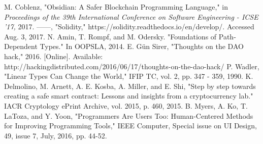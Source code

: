 \documentclass[sigplan,10pt,review]{acmart}\settopmatter{printfolios=true}
\begin{document}
\begin{thebibliography}{9}
	M. Coblenz, "Obsidian: A Safer Blockchain Programming Language," 
	in \emph{Proceedings of the 39th International Conference on Software Engineering -
	ICSE '17,} 2017.
	------, "Solidity," https://solidity.readthedocs.io/en/develop/. Accessed Aug. 3, 2017.
	 N. Amin, T. Rompf, and M. Odersky. "Foundations of Path-Dependent Types." 
	 In OOPSLA, 2014.
	E. G{\"u}n Sirer, "Thoughts on the DAO hack," 2016. [Online]. 
	Available: http://hackingdistributed.com/2016/06/17/thoughts-on-the-dao-hack/
	P. Wadler, "Linear Types Can Change the World,"
	IFIP TC, vol. 2, pp. 347 - 359, 1990.
	K. Delmolino, M. Arnett, A. E. Kosba, A. Miller, and E. Shi, 
	"Step by step towards creating a safe smart contract: Lessons and insights from a cryptocurrency lab."
	IACR Cryptology ePrint Archive, vol. 2015, p. 460, 2015.
	B. Myers, A. Ko, T. LaToza, and Y. Yoon, 
	"Programmers Are Users Too: Human-Centered Methods for Improving Programming Tools," 
	IEEE Computer, Special issue on UI Design, 49, issue 7, July, 2016, pp. 44-52.
\end{thebibliography}
	
\end{document}
